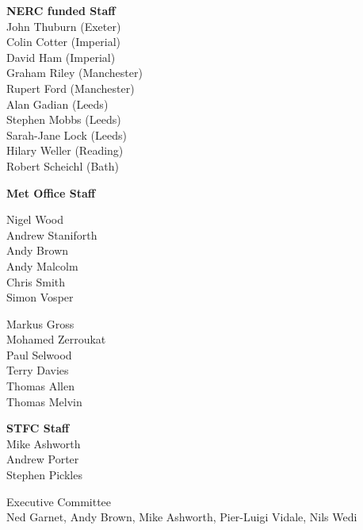 \begin{slide}
\begin{center}
\small
\begin{minipage}[t]{0.3\linewidth}\centering
{\bf NERC funded Staff \\}
John Thuburn (Exeter)\\
Colin Cotter (Imperial)\\
David Ham (Imperial)\\
Graham Riley (Manchester) \\
Rupert Ford (Manchester) \\
Alan Gadian (Leeds) \\
Stephen Mobbs (Leeds) \\
Sarah-Jane Lock (Leeds) \\
Hilary Weller (Reading) \\
Robert Scheichl (Bath) \\
\end{minipage}
\begin{minipage}[t]{0.43\linewidth}\centering
{\bf Met Office Staff \\}
\begin{minipage}[t]{0.49\linewidth}\centering
Nigel Wood \\
Andrew Staniforth \\
Andy Brown \\
Andy Malcolm \\
Chris Smith \\
Simon Vosper
\end{minipage}
\begin{minipage}[t]{0.49\linewidth}\centering
Markus Gross \\
Mohamed Zerroukat \\
Paul Selwood \\
Terry Davies \\
Thomas Allen \\
Thomas Melvin \\
\end{minipage}
\end{minipage}
\begin{minipage}[t]{0.25\linewidth}\centering
{\bf STFC Staff \\}
Mike Ashworth \\
Andrew Porter \\
Stephen Pickles
\end{minipage}

Executive Committee\\
Ned Garnet, Andy Brown, Mike Ashworth, Pier-Luigi Vidale, Nils Wedi

\end{center}
\end{slide}
